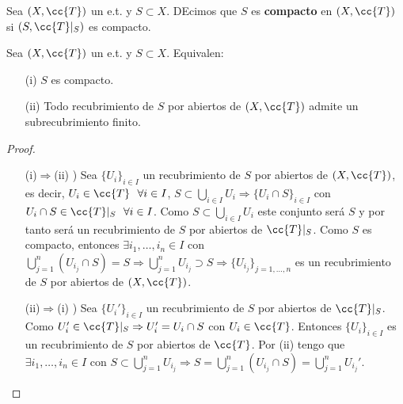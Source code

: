 \begin{definicion}
    Sea $(X, \cc{T})$ un e.t. y $S\subset X$. DEcimos que $S$ es \textbf{compacto} en $(X, \cc{T})$ si $(S, \cc{T}|_S)$ es compacto.
    \endsquare
\end{definicion}

\begin{prop}
    Sea $(X, \cc{T})$ un e.t. y $S\subset X$. Equivalen:
    \begin{enumerate}
        \item[(i)] $S$ es compacto.
        \item[(ii)] Todo recubrimiento de $S$ por abiertos de $(X, \cc{T})$ admite un subrecubrimiento finito. 
    \end{enumerate}
    \begin{proof}\
        \begin{itemize}
            \item[(i)$\Rightarrow$(ii) )] Sea $\{U_i\}_{i\in I}$ un recubrimiento de $S$ por abiertos de $(X, \cc{T})$, es decir, $U_i\in \cc{T}\ \ \forall i \in I$, $S\subset \bigcup\limits_{i\in I}U_i \Rightarrow \{U_i\cap S\}_{i\in I}$ con $U_i\cap S\in \cc{T}|_S\ \ \forall i \in I$. Como $S\subset \bigcup\limits_{i\in I}U_i$ este conjunto será $S$ y por tanto será un recubrimiento de $S$ por abiertos de $\cc{T}|_S$. Como $S$ es compacto, entonces $\exists i_1,\dots,i_n\in I$ con $\bigcup\limits_{j=1}^{n}(U_{i_j}\cap S)=S \Rightarrow \bigcup\limits_{j=1}^{n}U_{i_j}\supset S \Rightarrow \{U_{i_j}\}_{j=1,\dots,n}$ es un recubrimiento de $S$ por abiertos de $(X, \cc{T})$.
            \item[(ii)$\Rightarrow$(i) )] Sea $\{U_i'\}_{i\in I}$ un recubrimiento de $S$ por abiertos de $\cc{T}|_S$. Como $U_i'\in \cc{T}|_S\Rightarrow U_i'=U_i\cap S$ con $U_i\in \cc{T}$. Entonces $\{U_i\}_{i\in I}$ es un recubrimiento de $S$ por abiertos de $\cc{T}$. Por (ii) tengo que $\exists i_1,\dots,i_n\in I$ con $S\subset \bigcup\limits_{j=1}^{n}U_{i_j} \Rightarrow S = \bigcup\limits_{j=1}^{n}(U_{i_j}\cap S) = \bigcup\limits_{j=1}^{n}U_{i_j}'$.
        \end{itemize}
    \end{proof}
\end{prop}

